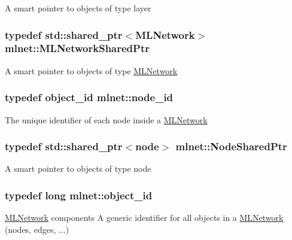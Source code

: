 A smart pointer to objects of type layer \hypertarget{namespacemlnet_aa6d3fa87865bcde4d1283abb1942cbbb}{
\subsubsection[{M\+L\+Network\+Shared\+Ptr}]{\setlength{\rightskip}{0pt plus 5cm}typedef std\+::shared\+\_\+ptr$<${\bf M\+L\+Network}$>$ {\bf mlnet\+::\+M\+L\+Network\+Shared\+Ptr}}}\label{namespacemlnet_aa6d3fa87865bcde4d1283abb1942cbbb}
A smart pointer to objects of type \hyperlink{classmlnet_1_1_m_l_network}{M\+L\+Network} \hypertarget{namespacemlnet_a4c354f08ca868982bf3ddae882ff71c6}{
\subsubsection[{node\+\_\+id}]{\setlength{\rightskip}{0pt plus 5cm}typedef {\bf object\+\_\+id} {\bf mlnet\+::node\+\_\+id}}}\label{namespacemlnet_a4c354f08ca868982bf3ddae882ff71c6}
The unique identifier of each node inside a \hyperlink{classmlnet_1_1_m_l_network}{M\+L\+Network} \hypertarget{namespacemlnet_acf8b1b6deb52e7dacfc676c689f9a10c}{
\subsubsection[{Node\+Shared\+Ptr}]{\setlength{\rightskip}{0pt plus 5cm}typedef std\+::shared\+\_\+ptr$<${\bf node}$>$ {\bf mlnet\+::\+Node\+Shared\+Ptr}}}\label{namespacemlnet_acf8b1b6deb52e7dacfc676c689f9a10c}
A smart pointer to objects of type node \hypertarget{namespacemlnet_a318fc9bfdb74e1da4d44d0c50d4a453d}{
\subsubsection[{object\+\_\+id}]{\setlength{\rightskip}{0pt plus 5cm}typedef long {\bf mlnet\+::object\+\_\+id}}}\label{namespacemlnet_a318fc9bfdb74e1da4d44d0c50d4a453d}
\hyperlink{classmlnet_1_1_m_l_network}{M\+L\+Network} components A generic identifier for all objects in a \hyperlink{classmlnet_1_1_m_l_network}{M\+L\+Network} (nodes, edges, ...) 

